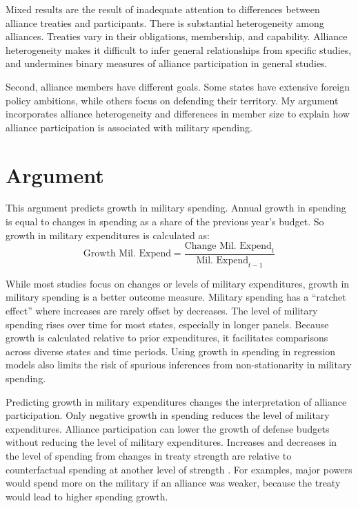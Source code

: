 \documentclass[12pt]{article}
\begin{document}
Mixed results are the result of inadequate attention to differences between alliance treaties and participants.
There is substantial heterogeneity among alliances.
Treaties vary in their obligations, membership, and capability. 
Alliance heterogeneity makes it difficult to infer general relationships from specific studies, and undermines binary measures of alliance participation in general studies. 
 

Second, alliance members have different goals.
Some states have extensive foreign policy ambitions, while others focus on defending their territory. 
My argument incorporates alliance heterogeneity and differences in member size to explain how alliance participation is associated with military spending. 



\section{Argument}

This argument predicts growth in military spending. 
Annual growth in spending is equal to changes in spending as a share of the previous year's budget. 
So growth in military expenditures is calculated as:
\begin{equation}
\mbox{Growth Mil. Expend} = \frac{ \mbox{Change Mil. Expend}_t }{ \mbox{Mil. Expend}_{t-1} }
\end{equation} 


While most studies focus on changes or levels of military expenditures, growth in military spending is a better outcome measure. 
Military spending has a ``ratchet effect'' where increases are rarely offset by decreases. 
The level of military spending rises over time for most states, especially in longer panels. 
Because growth is calculated relative to prior expenditures, it facilitates comparisons across diverse states and time periods. 
Using growth in spending in regression models also limits the risk of spurious inferences from non-stationarity in military spending. 


Predicting growth in military expenditures changes the interpretation of alliance participation. 
Only negative growth in spending reduces the level of military expenditures. 
Alliance participation can lower the growth of defense budgets without reducing the level of military expenditures. 
Increases and decreases in the level of spending from changes in treaty strength are relative to counterfactual spending at another level of strength \citep{Fearon1991}. 
For examples, major powers would spend more on the military if an alliance was weaker, because the treaty would lead to higher spending growth. 
\end{document}
